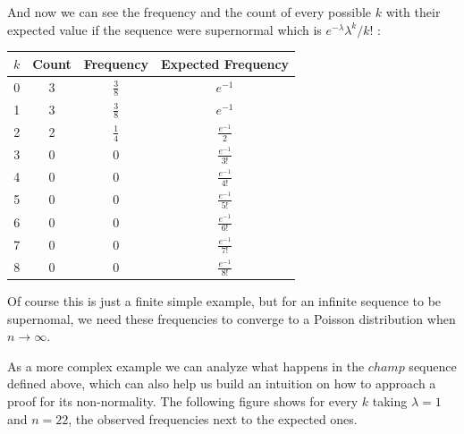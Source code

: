 \documentclass[11pt,a4paper]{tesis}
\begin{document}
And now we can see the frequency and the count of every possible $k$ with their
 expected value if the sequence were supernormal which is ${e^{-\lambda}\lambda^k}/{k!}$ :

\begin{center}
    \begin{tabular}{|c | c |  c| c |} 
    \hline
    $k$ & Count &  Frequency & Expected Frequency \\ [0.1ex] 
    \hline
    0 & 3 & $\frac{3}{8}$ & $e^{-1} $ \\ [0.5ex] 
    \hline
    1 & 3 &$\frac{3}{8}$ & $e^{-1} $ \\  [0.5ex] 
    \hline
    2 & 2 &$\frac{1}{4}$ & $\frac{e^{-1}}{2} $ \\  [0.5ex] 
    \hline
    3 & 0 & 0 & $\frac{e^{-1}}{3!} $ \\  [0.5ex] 
    \hline
    4 & 0 & 0 & $\frac{e^{-1}}{4!} $ \\ [0.5ex] 
    \hline
    5 & 0 & 0 & $\frac{e^{-1}}{5!} $ \\ [0.5ex] 
    \hline
    6 & 0 & 0  & $\frac{e^{-1}}{6!} $ \\ [0.5ex] 
    \hline
    7 & 0 & 0 & $\frac{e^{-1}}{7!} $ \\ [0.5ex] 
    \hline
    8 & 0 & 0 & $\frac{e^{-1}}{8!} $ \\  [0.5ex] 
    \hline
   \end{tabular}
\end{center}

Of course this is just a finite simple example, but for an infinite sequence to be supernomal, we need these frequencies to converge to a Poisson distribution when $n \rightarrow \infty$. 

As a more complex example we can analyze what happens in the $champ$ sequence defined above, which can also help us build an intuition on how to approach a proof for its non-normality.
The following figure shows for every $k$ taking $\lambda = 1$ and $n = 22$, the observed frequencies next to the expected ones.

\end{document}
